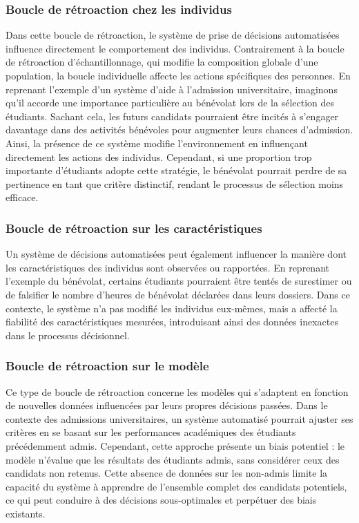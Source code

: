 \documentclass{article}
\theoremstyle{definition}
\begin{document}
\subsubsection{Boucle de rétroaction chez les individus}
Dans cette boucle de rétroaction, le système de prise de décisions automatisées influence directement le comportement des individus. Contrairement à la boucle de rétroaction d'échantillonnage, qui modifie la composition globale d'une population, la boucle individuelle affecte les actions spécifiques des personnes. En reprenant l'exemple d'un système d'aide à l'admission universitaire, imaginons qu'il accorde une importance particulière au bénévolat lors de la sélection des étudiants. Sachant cela, les futurs candidats pourraient être incités à s'engager davantage dans des activités bénévoles pour augmenter leurs chances d'admission. Ainsi, la présence de ce système modifie l'environnement en influençant directement les actions des individus. Cependant, si une proportion trop importante d'étudiants adopte cette stratégie, le bénévolat pourrait perdre de sa pertinence en tant que critère distinctif, rendant le processus de sélection moins efficace.

\subsubsection{Boucle de rétroaction sur les caractéristiques}
Un système de décisions automatisées peut également influencer la manière dont les caractéristiques des individus sont observées ou rapportées. En reprenant l'exemple du bénévolat, certains étudiants pourraient être tentés de surestimer ou de falsifier le nombre d'heures de bénévolat déclarées dans leurs dossiers. Dans ce contexte, le système n'a pas modifié les individus eux-mêmes, mais a affecté la fiabilité des caractéristiques mesurées, introduisant ainsi des données inexactes dans le processus décisionnel.

\subsubsection{Boucle de rétroaction sur le modèle}
Ce type de boucle de rétroaction concerne les modèles qui s'adaptent en fonction de nouvelles données influencées par leurs propres décisions passées. Dans le contexte des admissions universitaires, un système automatisé pourrait ajuster ses critères en se basant sur les performances académiques des étudiants précédemment admis. Cependant, cette approche présente un biais potentiel : le modèle n'évalue que les résultats des étudiants admis, sans considérer ceux des candidats non retenus. Cette absence de données sur les non-admis limite la capacité du système à apprendre de l'ensemble complet des candidats potentiels, ce qui peut conduire à des décisions sous-optimales et perpétuer des biais existants.
\end{document}
